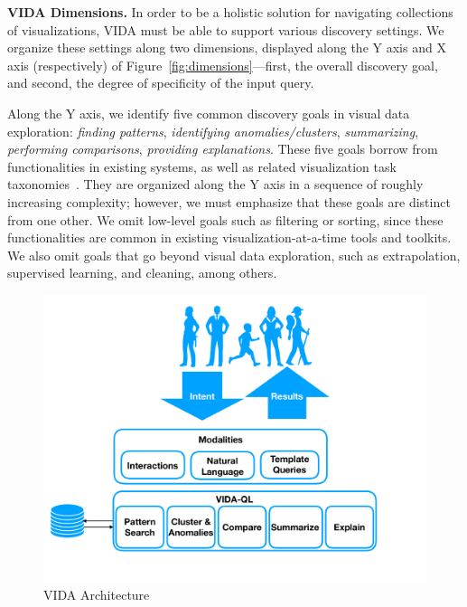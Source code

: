 \documentclass[11pt]{article}
\newcommand{\stitle}[1]{\par\noindent\textbf{#1}}
\newcommand{\vida}{\textsc{VIDA}\xspace}
\begin{document}
\par \stitle{\vida Dimensions.} 
In order to be a holistic solution for 
navigating collections of visualizations,
\vida must be able to support various discovery
settings. 
We organize these settings along two
dimensions, displayed along the Y axis and 
X axis (respectively) of Figure~\ref{fig:dimensions}---first, 
the overall discovery goal,
and second, the degree of specificity of the input query.

\par Along the Y axis, we identify five 
common discovery goals in visual data exploration:
{\em finding patterns}, {\em identifying anomalies/clusters}, {\em summarizing}, 
{\em performing comparisons}, {\em providing explanations}.
These five goals borrow from functionalities in existing
systems, as well as related visualization task taxonomies~\cite{Amar2005,Heer2012}.
They are organized along the Y axis in a sequence of roughly increasing complexity; however, we must emphasize that these goals are distinct from one other. 
We omit low-level goals such as filtering or sorting, since these functionalities are common in existing visualization-at-a-time tools and toolkits. We also omit goals that go beyond visual data exploration, such as extrapolation, supervised learning, and cleaning, among others. 

\begin{figure}
\centering
\vspace{-15pt}
\includegraphics[width=\linewidth]{figs/VIDA_architecture.pdf}
\vspace{-25pt}
\caption{\vida Architecture\label{fig:vida_architecture}
\vspace{-15pt}
}
\end{figure}
\end{document}
